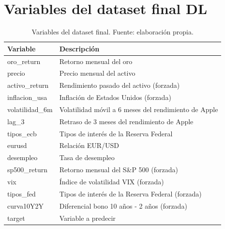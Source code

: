 \section{Variables del dataset final DL}
\label{sec:variables_dataset_finaldl}
\begin{table}[H]
\centering
\begin{tabular}{|p{5cm}|p{9.5cm}|}
\hline
\textbf{Variable} & \textbf{Descripción} \\
\hline
oro\_return & Retorno mensual del oro \\
\hline
precio & Precio mensual del activo \\
\hline
activo\_return & Rendimiento pasado del activo (forzada) \\
\hline
inflacion\_usa & Inflación de Estados Unidos (forzada) \\
\hline
volatilidad\_6m & Volatilidad móvil a 6 meses del rendimiento de Apple \\
\hline
lag\_3 & Retraso de 3 meses del rendimiento de Apple \\
\hline
tipos\_ecb & Tipos de interés de la Reserva Federal \\
\hline
eurusd & Relación EUR/USD \\
\hline
desempleo & Tasa de desempleo \\
\hline
sp500\_return & Retorno mensual del S\&P 500 (forzada) \\
\hline
vix & Índice de volatilidad VIX (forzada) \\
\hline
tipos\_fed & Tipos de interés de la Reserva Federal (forzada) \\
\hline
curva10Y2Y & Diferencial bono 10 años - 2 años (forzada) \\
\hline
target & Variable a predecir \\
\hline
\end{tabular}
\label{tab:variables_dataset_finaldl}
\caption{Variables del dataset final. Fuente: elaboración propia.}
\end{table}

